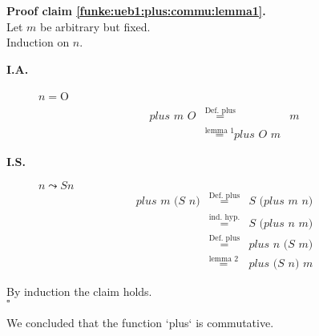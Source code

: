 \documentclass[11pt,a4paper,ngerman]{article}
\begin{document}
\textbf{Proof claim \ref{funke:ueb1:plus:commu:lemma1}.}\\
Let $m$ be arbitrary but fixed.\\
Induction on $n$.\\
\begin{description}
   \item[\bfseries I.A.] $n=$O\\
      $$\begin{array}{rcl}
         \textit{plus m O} &\stackrel{\text{Def. plus}}{=}& \textit{m} \\
         &\stackrel{\text{lemma 1}}{=} \textit{plus O m}
      \end{array}$$
   \item[\bfseries I.S.] $n \leadsto S n$\\
      $$\begin{array}{rcl}
         \textit{plus m (S n)} &\stackrel{\text{Def. plus}}{=}&
            \textit{S (plus m n)}\\
         &\stackrel{\text{ind. hyp.}}{=}&
            \textit{S (plus n m)}\\
         &\stackrel{\text{Def. plus}}{=}&
            \textit{plus n (S m)}\\
         &\stackrel{\text{lemma 2}}{=}&
            \textit{plus (S n) m}
      \end{array}$$
\end{description}
By induction the claim holds.\\
\mbox{}\hfill$\square$

We concluded that the function `plus` is commutative.

\label{LastPage}
\end{document}
